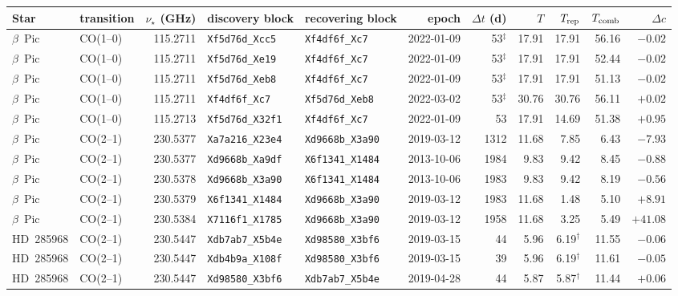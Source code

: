 \begin{tabular}{@{}llrllrrrrrr@{}}
\hline
Star & transition & $\nu_\star$ (GHz) & discovery block & recovering block & epoch & $\Delta t$ (d) & $T$ & $T_{\rm rep}$ & $T_{\rm comb}$ & $\Delta c$ \\
\hline
$\beta$~Pic & CO(1--0) & 115.2711 & \texttt{Xf5d76d\_Xcc5} & \texttt{Xf4df6f\_Xc7} & 2022-01-09 & 53$^\ddagger$ & 17.91 & 17.91 & 56.16 & $-0.02$ \\
$\beta$~Pic & CO(1--0) & 115.2711 & \texttt{Xf5d76d\_Xe19} & \texttt{Xf4df6f\_Xc7} & 2022-01-09 & 53$^\ddagger$ & 17.91 & 17.91 & 52.44 & $-0.02$ \\
$\beta$~Pic & CO(1--0) & 115.2711 & \texttt{Xf5d76d\_Xeb8} & \texttt{Xf4df6f\_Xc7} & 2022-01-09 & 53$^\ddagger$ & 17.91 & 17.91 & 51.13 & $-0.02$ \\
$\beta$~Pic & CO(1--0) & 115.2711 & \texttt{Xf4df6f\_Xc7} & \texttt{Xf5d76d\_Xeb8} & 2022-03-02 & 53$^\ddagger$ & 30.76 & 30.76 & 56.11 & $+0.02$ \\
$\beta$~Pic & CO(1--0) & 115.2713 & \texttt{Xf5d76d\_X32f1} & \texttt{Xf4df6f\_Xc7} & 2022-01-09 & 53 & 17.91 & 14.69 & 51.38 & $+0.95$ \\
$\beta$~Pic & CO(2--1) & 230.5377 & \texttt{Xa7a216\_X23e4} & \texttt{Xd9668b\_X3a90} & 2019-03-12 & 1312 & 11.68 & 7.85 & 6.43 & $-7.93$ \\
$\beta$~Pic & CO(2--1) & 230.5377 & \texttt{Xd9668b\_Xa9df} & \texttt{X6f1341\_X1484} & 2013-10-06 & 1984 & 9.83 & 9.42 & 8.45 & $-0.88$ \\
$\beta$~Pic & CO(2--1) & 230.5378 & \texttt{Xd9668b\_X3a90} & \texttt{X6f1341\_X1484} & 2013-10-06 & 1983 & 9.83 & 9.42 & 8.19 & $-0.56$ \\
$\beta$~Pic & CO(2--1) & 230.5379 & \texttt{X6f1341\_X1484} & \texttt{Xd9668b\_X3a90} & 2019-03-12 & 1983 & 11.68 & 1.48 & 5.10 & $+8.91$ \\
$\beta$~Pic & CO(2--1) & 230.5384 & \texttt{X7116f1\_X1785} & \texttt{Xd9668b\_X3a90} & 2019-03-12 & 1958 & 11.68 & 3.25 & 5.49 & $+41.08$ \\
HD~285968 & CO(2--1) & 230.5447 & \texttt{Xdb7ab7\_X5b4e} & \texttt{Xd98580\_X3bf6} & 2019-03-15 & 44 & 5.96 & 6.19$^\dagger$ & 11.55 & $-0.06$ \\
HD~285968 & CO(2--1) & 230.5447 & \texttt{Xdb4b9a\_X108f} & \texttt{Xd98580\_X3bf6} & 2019-03-15 & 39 & 5.96 & 6.19$^\dagger$ & 11.61 & $-0.05$ \\
HD~285968 & CO(2--1) & 230.5447 & \texttt{Xd98580\_X3bf6} & \texttt{Xdb7ab7\_X5b4e} & 2019-04-28 & 44 & 5.87 & 5.87$^\dagger$ & 11.44 & $+0.06$ \\
\hline
\end{tabular}
